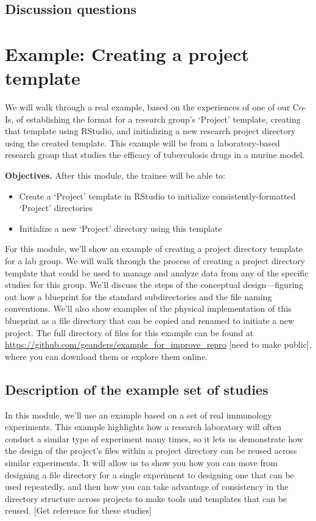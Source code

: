 \documentclass[]{tufte-book}
\providecommand{\tightlist}{%
  \setlength{\itemsep}{0pt}\setlength{\parskip}{0pt}}
\begin{document}
\subsection{Discussion questions}\label{discussion-questions-1}

\section{Example: Creating a project template}\label{module8}

We will walk through a real example, based on the experiences of one of our
Co-Is, of establishing the format for a research group's `Project' template,
creating that template using RStudio, and initializing a new research project
directory using the created template. This example will be from a
laboratory-based research group that studies the efficacy of tuberculosis drugs
in a murine model.

\textbf{Objectives.} After this module, the trainee will be able to:

\begin{itemize}
\tightlist
\item
  Create a `Project' template in RStudio to initialize consistently-formatted
  `Project' directories
\item
  Initialize a new `Project' directory using this template
\end{itemize}

For this module, we'll show an example of creating a project directory template
for a lab group. We will walk through the process of creating a project
directory template that could be used to manage and analyze data from any of the
specific studies for this group. We'll discuss the steps of the conceptual
design---figuring out how a blueprint for the standard subdirectories and the
file naming conventions. We'll also show examples of the physical implementation
of this blueprint as a file directory that can be copied and renamed to initiate
a new project. The full directory of files for this example can be found at
\url{https://github.com/geanders/example_for_improve_repro} {[}need to make public{]},
where you can download them or explore them online.

\subsection{Description of the example set of studies}\label{description-of-the-example-set-of-studies}

In this module, we'll use an example based on a set of real immunology
experiments. This example highlights how a research laboratory will often
conduct a similar type of experiment many times, so it lets us demonstrate how
the design of the project's files within a project directory can be reused
across similar experiments. It will allow us to show you how you can move from
designing a file directory for a single experiment to designing one that can be
used repeatedly, and then how you can take advantage of consistency in the
directory structure across projects to make tools and templates that can be
reused. {[}Get reference for these studies{]}
\end{document}
